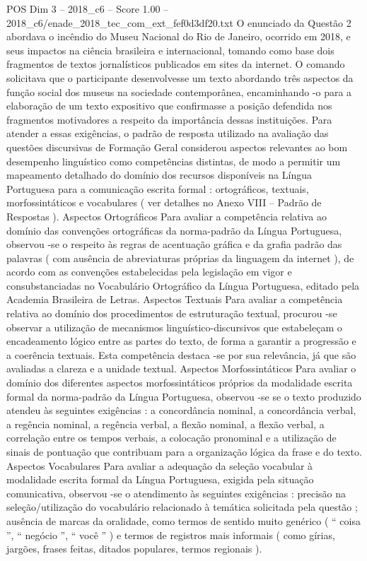 \begin{textsample}{POS Dim 3 – 2018\_c6 – Score 1.00 – 2018\_c6/enade\_2018\_tec\_com\_ext\_fef0d3df20.txt}
O enunciado da Questão 2 abordava o incêndio do Museu Nacional do Rio de Janeiro, ocorrido em 2018, e seus impactos na ciência brasileira e internacional, tomando como base dois fragmentos de textos jornalísticos publicados em sites da internet.
O comando solicitava que o participante desenvolvesse um texto abordando três aspectos da função social dos museus na sociedade contemporânea, encaminhando -o para a elaboração de um texto expositivo que confirmasse a posição defendida nos fragmentos motivadores a respeito da importância dessas instituições.
Para atender a essas exigências, o padrão de resposta utilizado na avaliação das questões discursivas de Formação Geral considerou aspectos relevantes ao bom desempenho linguístico como competências distintas, de modo a permitir um mapeamento detalhado do domínio dos recursos disponíveis na Língua Portuguesa para a comunicação escrita formal : ortográficos, textuais, morfossintáticos e vocabulares ( ver detalhes no Anexo VIII – Padrão de Respostas ).
Aspectos Ortográficos Para avaliar a competência relativa ao domínio das convenções ortográficas da norma-padrão da Língua Portuguesa, observou -se o respeito às regras de acentuação gráfica e da grafia padrão das palavras ( com ausência de abreviaturas próprias da linguagem da internet ), de acordo com as convenções estabelecidas pela legislação em vigor e consubstanciadas no Vocabulário Ortográfico da Língua Portuguesa, editado pela Academia Brasileira de Letras.
Aspectos Textuais Para avaliar a competência relativa ao domínio dos procedimentos de estruturação textual, procurou -se observar a utilização de mecanismos linguístico-discursivos que estabeleçam o encadeamento lógico entre as partes do texto, de forma a garantir a progressão e a coerência textuais.
Esta competência destaca -se por sua relevância, já que são avaliadas a clareza e a unidade textual.
Aspectos Morfossintáticos Para avaliar o domínio dos diferentes aspectos morfossintáticos próprios da modalidade escrita formal da norma-padrão da Língua Portuguesa, observou -se se o texto produzido atendeu às seguintes exigências : a concordância nominal, a concordância verbal, a regência nominal, a regência verbal, a flexão nominal, a flexão verbal, a correlação entre os tempos verbais, a colocação pronominal e a utilização de sinais de pontuação que contribuam para a organização lógica da frase e do texto.
Aspectos Vocabulares Para avaliar a adequação da seleção vocabular à modalidade escrita formal da Língua Portuguesa, exigida pela situação comunicativa, observou -se o atendimento às seguintes exigências : precisão na seleção/utilização do vocabulário relacionado à temática solicitada pela questão ; ausência de marcas da oralidade, como termos de sentido muito genérico ( “ coisa ”, “ negócio ”, “ você ” ) e termos de registros mais informais ( como gírias, jargões, frases feitas, ditados populares, termos regionais ).

\end{textsample}
